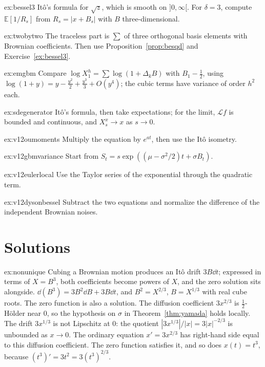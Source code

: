 \begin{hint}{ex:bessel3}
It\^o's formula for $\sqrt z$, which is smooth on $]0,\infty[$. For $\delta=3$, compute $\mathbb E[1/R_s]$ from $R_s=|x+B_s|$ with $B$ three-dimensional.
\end{hint}

\begin{hint}{ex:twobytwo}
The traceless part is $\sum$ of three orthogonal basis elements with Brownian coefficients. Then use Proposition~\ref{prop:besqd} and Exercise~\ref{ex:bessel3}.
\end{hint}

\begin{hint}{ex:emgbm}
Compare $\log X^h_1=\sum\log(1+\Delta_kB)$ with $B_1-\frac12$, using $\log(1+y)=y-\frac{y^2}2+\frac{y^3}3+O(y^4)$; the cubic terms have variance of order $h^2$ each.
\end{hint}

\begin{hint}{ex:sdegenerator}
It\^o's formula, then take expectations; for the limit, $\mathcal Lf$ is bounded and continuous, and $X^x_s\to x$ as $s\to0$.
\end{hint}

\begin{hint}{ex:v12oumoments}
Multiply the equation by $e^{at}$, then use the Itô isometry.
\end{hint}

\begin{hint}{ex:v12gbmvariance}
Start from $S_t=s\exp((\mu-\sigma^2/2)t+\sigma B_t)$.
\end{hint}

\begin{hint}{ex:v12eulerlocal}
Use the Taylor series of the exponential through the quadratic term.
\end{hint}

\begin{hint}{ex:v12dysonbessel}
Subtract the two equations and normalize the difference of the independent Brownian noises.
\end{hint}

\section{Solutions}

\begin{solution}{ex:nonunique}
\idea Cubing a Brownian motion produces an It\^o drift $3B\dd t$; expressed in terms of $X=B^3$, both coefficients become powers of $X$, and the zero solution sits alongside.
\writeup $\dd(B^3)=3B^2\dd B+3B\dd t$, and $B^2=X^{2/3}$, $B=X^{1/3}$ with real cube roots. The zero function is also a solution. The diffusion coefficient $3x^{2/3}$ is $\frac12$-H\"older near $0$, so the
hypothesis on $\sigma$ in Theorem~\ref{thm:yamada} holds locally. The drift $3x^{1/3}$ is not Lipschitz at $0$: the quotient $|3x^{1/3}|/|x|=3|x|^{-2/3}$ is unbounded as $x\to0$. The ordinary equation $x'=3x^{2/3}$ has right-hand side equal to this diffusion coefficient. The zero function satisfies it, and so does $x(t)=t^3$, because $(t^3)'=3t^2=3(t^3)^{2/3}$.
\end{solution}

